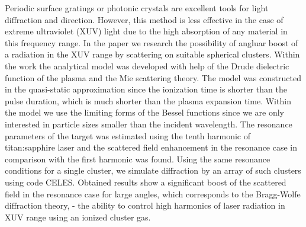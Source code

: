Periodic surface gratings or photonic crystals are excellent tools for light diffraction and direction. However, this method is less effective in the case of extreme ultraviolet (XUV) light due to the high absorption of any material in this frequency range. In the paper we research the possibility of angluar boost of a radiation in the XUV range by scattering on suitable spherical clusters. Within the work the analytical model was developed with help of the Drude dielectric function of the plasma and the Mie scattering theory. The model was constructed in the quasi-static approximation since the ionization time is shorter than the pulse duration, which is much shorter than the plasma expansion time. Within the model we use the limiting forms of the Bessel functions since we are only interested in particle sizes smaller than the incident wavelength. The resonance parameters of the target was estimated using the tenth harmonic of titan:sapphire laser and the scattered field enhancement in the resonance case in comparison with the first harmonic was found. Using the same resonance conditions for a single cluster, we simulate diffraction by an array of such clusters using code CELES. Obtained results show a significant boost of the scattered field in the resonance case for large angles, which corresponds to the Bragg-Wolfe diffraction theory, - the ability to control high harmonics of laser radiation in XUV range using an ionized cluster gas.